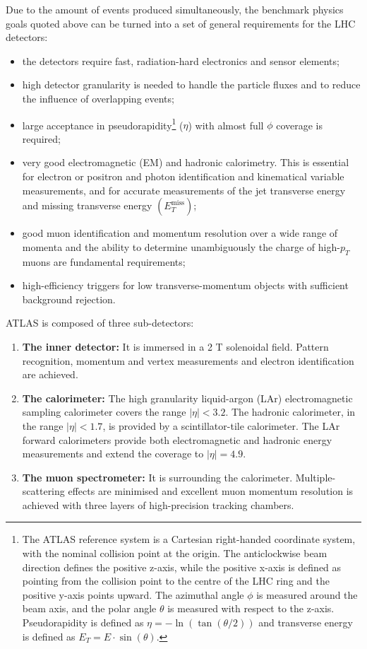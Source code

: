 \documentclass[12pt, twoside]{article}
\numberwithin{equation}{section}
\numberwithin{figure}{section}
\begin{document}
Due to the amount of events produced simultaneously, the benchmark physics goals quoted above can be turned into a set of general requirements for the LHC detectors:
\setcounter{footnote}{0}
\begin{itemize}
    \item the detectors require fast, radiation-hard electronics and sensor elements;
    \item high detector granularity is needed to handle the particle fluxes and to reduce the influence of overlapping events;
    \item large acceptance in pseudorapidity\footnote{ The ATLAS reference system is a Cartesian right-handed coordinate system, with the nominal collision point at the origin. The anticlockwise beam direction defines the positive z-axis, while the positive x-axis is defined as pointing from the collision point to the centre of the LHC ring and the positive y-axis points upward. The azimuthal angle $\phi$ is measured around the beam axis, and the polar angle $\theta$ is measured with respect to the z-axis. Pseudorapidity is defined as $\eta = -\ln \left( \tan \left(\theta / 2 \right) \right)$ and transverse energy is defined as $E_{T} = E \cdot \sin \left(\theta \right)$.} ($\eta$) with almost full $\phi$ coverage is required;
    \item very good electromagnetic (EM) and hadronic calorimetry. This is essential for electron or positron and photon identification and kinematical variable measurements, and for accurate measurements of the jet transverse energy and missing transverse energy $\left(E_{T}^{\text{miss}} \right)$;
    \item good muon identification and momentum resolution over a wide range of momenta and the ability to determine unambiguously the charge of high-$p_{T}$ muons are fundamental requirements;
    \item high-efficiency triggers for low transverse-momentum objects with sufficient background rejection.
\end{itemize}

ATLAS is composed of three sub-detectors:
\begin{enumerate}
    \item \textbf{The inner detector:} It is immersed in a 2 T solenoidal field. Pattern recognition, momentum and vertex measurements and electron identification are achieved.
    \item \textbf{The calorimeter:} The high granularity liquid-argon (LAr) electromagnetic sampling calorimeter covers the range $|\eta| < 3.2$. The hadronic calorimeter, in the range $|\eta| < 1.7$, is provided by a scintillator-tile calorimeter. The LAr forward calorimeters provide both electromagnetic and hadronic energy measurements and extend the coverage to $|\eta| = 4.9$.
    \item \textbf{The muon spectrometer:} It is surrounding the calorimeter. Multiple-scattering effects are minimised and excellent muon momentum resolution is achieved with three layers of high-precision tracking chambers.
\end{enumerate}
\end{document}
